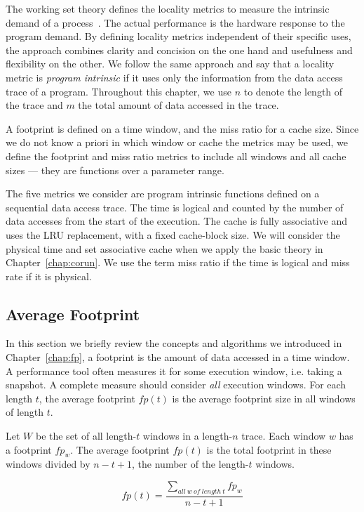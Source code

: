 The working set theory defines the locality metrics to measure the
intrinsic demand of a process~\cite{Denning:CACM68}.   The actual
performance is the hardware response to the program demand.  By
defining locality metrics independent of their specific uses, the
approach combines clarity and concision on the one hand and usefulness
and flexibility on the other. We follow the same approach and say that
a locality metric is \emph{program intrinsic} if it uses only the
information from the data access trace of a program.  Throughout this
chapter, we use $n$ to denote the length of the trace and $m$ the
total amount of data accessed in the trace. 

A footprint is defined on a time window, and the miss ratio for a
cache size.  Since we do not know a priori in which window or
cache the metrics may be used, we define the footprint and miss ratio
metrics to include all windows and all cache sizes --- they are
functions over a parameter range.

The five metrics we consider are program intrinsic functions defined
on a sequential data access trace.  The time is logical and counted by
the number of data accesses from the start of the execution.  The
cache is fully associative and uses the LRU replacement, with a fixed
cache-block size.  We will consider the physical time and set
associative cache when we apply the basic theory in
Chapter~\ref{chap:corun}.  We use the term miss ratio if the time is
logical and miss rate if it is physical. 

\subsection{Average Footprint}

In this section we briefly review the concepts and algorithms we
introduced in Chapter~\ref{chap:fp}, a footprint is the amount of data
accessed in a time window.  A performance tool often measures it for
some execution window, i.e. taking a snapshot.  A complete measure
should consider \emph{all} execution windows.  For each length $t$,
the average footprint $fp(t)$ is the average footprint size in all
windows of length $t$. 

Let $W$ be the set of all length-$t$ windows in a length-$n$ trace.
Each window $w$ has a footprint $fp_w$. The average footprint $fp(t)$
is the total footprint in these windows divided by $n-t+1$, the number
of the length-$t$ windows. 

$$fp(t) = \frac{\sum_{all\ w\ of\ length\ t} fp_w}{n-t+1}$$

